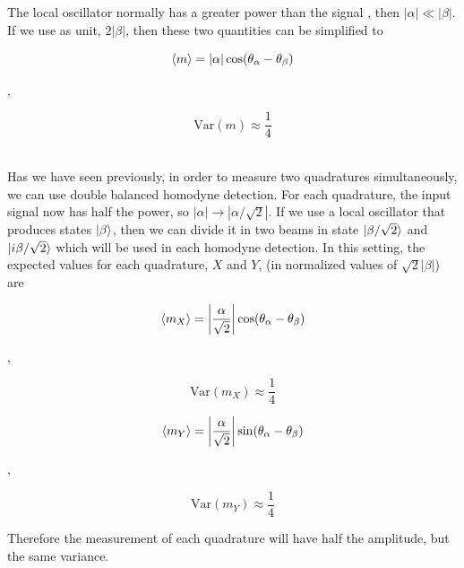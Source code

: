 %
The local oscillator normally has a greater power than the signal
, then $|\alpha| \ll |\beta|$. If we use as unit, $2|\beta|$, then these two quantities can be simplified to
%
\begin{center}
	\begin{minipage}{52mm}
		\noindent
		\begin{equation}
			\braket{m} = |\alpha|\cos({\theta_\alpha - \theta_\beta})
		\end{equation}
	\end{minipage}
	$,\quad$
	\begin{minipage}{34mm}
		\noindent
		\begin{equation}
			\textrm{Var}(m) \approx \frac{1}{4}
		\end{equation}
	\end{minipage}
\end{center}
%
\cite{hans2004}
\\
Has we have seen previously, in order to measure two quadratures simultaneously, we can use double balanced homodyne detection. For each quadrature, the input signal now has half the power, so $|\alpha| \rightarrow |\alpha/\sqrt{2}|$.  If we use a local oscillator that produces states $\ket{\beta}$, then we can divide it in two beams in state $\ket{\beta/\sqrt{2}}$ and $\ket{i\beta/\sqrt{2}}$ which will be used in each homodyne detection. In this setting, the expected values for each quadrature, $X$ and $Y$, (in normalized values of $\sqrt{2}|\beta|$) are
%
\begin{center}
	\begin{minipage}{58mm}
		\noindent
		\begin{equation}
			\braket{m_X} = \left|\frac{\alpha}{\sqrt{2}}\right| \cos({\theta_\alpha - \theta_\beta})
		\end{equation}
	\end{minipage}
	$,\quad$
	\begin{minipage}{37mm}
		\noindent
		\begin{equation}
			\textrm{Var}(m_X) \approx \frac{1}{4}
		\end{equation}
	\end{minipage}
\end{center}
%
%
\begin{center}
	\begin{minipage}{58mm}
		\noindent
		\begin{equation}
			\braket{m_Y} =  \left|\frac{\alpha}{\sqrt{2}}\right| \sin({\theta_\alpha - \theta_\beta})
		\end{equation}
	\end{minipage}
	$,\quad$
	\begin{minipage}{37mm}
		\noindent
		\begin{equation}
			\textrm{Var}(m_Y) \approx \frac{1}{4}
		\end{equation}
	\end{minipage}
\end{center}
%
Therefore the measurement of each quadrature will have half the amplitude, but the same variance.
%
%
%
